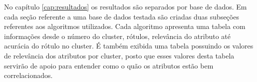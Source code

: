 
No capítulo \ref{cap:resultados} os resultados são separados por base de dados. Em cada seção referente a uma base de dados testada são criadas duas subseções referentes aos algoritmos utilizados. Cada algoritmo apresenta uma tabela com informações desde o número do cluster, rótulos, relevância do atributo até acurácia do rótulo no cluster. É também exibida uma tabela possuindo os valores de relevância dos atributos por cluster, posto que esses valores desta tabela servirão de apoio para entender como o quão os atributos estão bem correlacionados.





